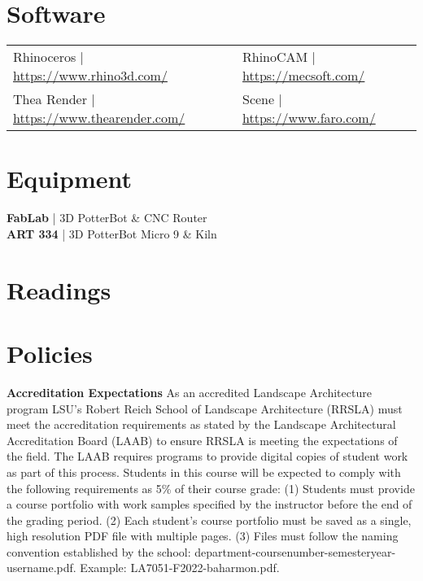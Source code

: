 \documentclass[11pt,article,oneside]{memoir}
\begin{document}
\section{Software}
\begin{table}[H]
\begin{tabular}{@{}l l}
Rhinoceros | \url{https://www.rhino3d.com/} &
RhinoCAM  | \url{https://mecsoft.com/}\\
Thea Render | \url{https://www.thearender.com/} &
Scene | \url{https://www.faro.com/} \\

\end{tabular}
\end{table}

\section{Equipment}
\textbf{FabLab} | 3D PotterBot \& CNC Router\\
\textbf{ART 334} | 3D PotterBot Micro 9 \& Kiln

\section{Readings}
\vspace*{0.5cm}
\nocite{*}
\setlength{}
\printbibliography[heading=none]


\section{Policies}

\noindent \textbf{Accreditation Expectations}
As an accredited Landscape Architecture program
LSU's Robert Reich School of Landscape Architecture (RRSLA) 
must meet the accreditation requirements 
as stated by the Landscape Architectural Accreditation
Board (LAAB) to ensure RRSLA is meeting the expectations of the field. 
The LAAB requires programs to provide digital copies 
of student work as part of this process.
Students in this course will be expected 
to comply with the following requirements
as 5\% of their course grade: 
(1) Students must provide a course portfolio
with work samples specified by the instructor 
before the end of the grading period. 
(2) Each student's course portfolio must be saved as 
a single, high resolution PDF file with multiple pages. 
(3) Files must follow the naming convention
established by the school: department-coursenumber-semesteryear-username.pdf.
Example: LA7051-F2022-baharmon.pdf.
\\
\end{document}
